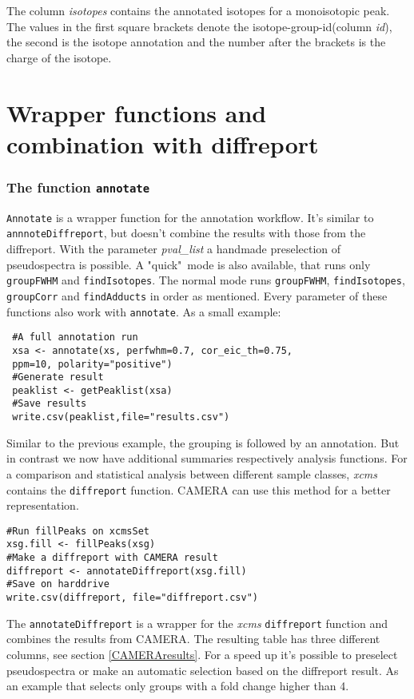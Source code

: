 \documentclass[a4paper,12pt]{article}
\newcommand{\Rfunction}[1]{{\texttt{#1}}}
\newcommand{\Rpackage}[1]{{\textit{#1}}}
\newcommand{\Rfunarg}[1]{{\textit{#1}}}
\begin{document}
The column \textit{isotopes} contains the annotated isotopes for a monoisotopic
peak. The values in the first square brackets denote the
isotope-group-id(column \textit{id}), the second is the isotope annotation and
the number after the brackets is the charge of the isotope.

\section{Wrapper functions and combination with diffreport}

\subsubsection{The function \Rfunction{annotate}}
\Rfunction{Annotate} is a wrapper function for the annotation workflow. It's similar to \Rfunction{annnoteDiffreport},
but doesn't combine the results with those from the diffreport. With the parameter \Rfunarg{pval\_list} a
handmade preselection of pseudospectra is possible. A
"quick"\ mode is also available, that runs only \Rfunction{groupFWHM} and
\Rfunction{findIsotopes}.
The normal mode runs \Rfunction{groupFWHM}, \Rfunction{findIsotopes},
\Rfunction{group\-Corr} and \Rfunction{findAdducts} in order as mentioned. Every
parameter of these functions also work with \Rfunction{annotate}.
As a small example:
\begin{verbatim}
 #A full annotation run
 xsa <- annotate(xs, perfwhm=0.7, cor_eic_th=0.75,
 ppm=10, polarity="positive")
 #Generate result
 peaklist <- getPeaklist(xsa)
 #Save results
 write.csv(peaklist,file="results.csv")
\end{verbatim}

Similar to the previous example, the grouping is followed by an annotation. But
in contrast we now have additional summaries respectively analysis
functions.
For a comparison and statistical analysis between different sample classes,
\Rpackage{xcms} contains the \Rfunction{diffreport} function. CAMERA can use
this method for a better representation.

\begin{verbatim}
#Run fillPeaks on xcmsSet
xsg.fill <- fillPeaks(xsg)
#Make a diffreport with CAMERA result
diffreport <- annotateDiffreport(xsg.fill)
#Save on harddrive
write.csv(diffreport, file="diffreport.csv")
\end{verbatim}

The \Rfunction{annotateDiffreport} is a wrapper for the \Rpackage{xcms}
\Rfunction{diffreport} function and combines the results from CAMERA. The
resulting table has three different columns, see section \ref{CAMERAresults}.
For a speed up it's possible to preselect pseudospectra or make an automatic
selection based on the diffreport result. As an example that selects only groups with a
fold change higher than 4.
\end{document}
